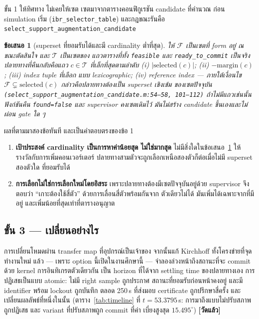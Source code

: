 \documentclass[12pt,a4paper]{article}
\newtheorem{proposition}{ข้อเสนอ}
\theoremstyle{remark}
\newcommand{\code}[1]{\texttt{\small #1}}
\newcommand{\measured}{\textcolor{ok}{\textbf{[วัดแล้ว]}}}
\begin{document}
ขั้น 1 ให้ทิศทาง ไม่เคยให้เซต เซตมาจากตารางคอนฟิกูเรชัน candidate ที่คำนวณ
ก่อน simulation เริ่ม (\code{ibr\_selector\_table}) และกฎขณะรันคือ
\code{select\_support\_augmentation\_candidate}

\begin{proposition}[superset ที่ยอมรับได้และมี cardinality ต่ำที่สุด]
\label{prop:superset}
ให้ $\mathcal{F}$ เป็นเซตที่ form อยู่ ณ ขณะตัดสินใจ และ $\mathcal{T}$ เป็นเซตของ
แถวตารางที่ทั้ง \code{feasible} และ \code{ready\_to\_commit} เป็นจริง
ปลายทางที่คืนกลับคือแถว $c \in \mathcal{T}$ ที่เล็กที่สุดตามลำดับ (i)
$|\mathrm{selected}(c)|$; (ii) $-\mathrm{margin}(c)$; (iii) index tuple ที่เลือก
แบบ lexicographic; (iv) reference index --- ภายใต้เงื่อนไข
$\mathcal{F} \subsetneq \mathrm{selected}(c)$ กล่าวคือปลายทางต้องเป็น superset
\emph{เชิงเข้ม} ของเซตปัจจุบัน
\code{(select\_support\_augmentation\_candidate.m:54--58, 101--112)}
ถ้าไม่มีแถวเช่นนั้น ฟังก์ชันคืน \code{found=false} และ supervisor คงเซตเดิมไว้
มันไม่สร้าง candidate ขึ้นเองและไม่ผ่อน gate ใด ๆ
\end{proposition}

ผลที่ตามมาสองข้อทันที และเป็นคำตอบตรงของข้อ 1

\begin{enumerate}[leftmargin=1.9em]
\item \textbf{เป้าประสงค์ cardinality เป็นการหาค่าน้อยสุด ไม่ใช่มากสุด}
      ไม่มีสิ่งใดในข้อเสนอ~\ref{prop:superset} ให้รางวัลกับการเพิ่มคอนเวอร์เตอร์
      ปลายทางสามตัวจะถูกเลือกเหนือสองตัวก็ต่อเมื่อไม่มี superset สองตัวใด
      ที่ยอมรับได้
\item \textbf{การเลือกไม่ใช่การเลือกใหม่โดยอิสระ} เพราะปลายทางต้องมีเซตปัจจุบันอยู่ด้วย
      supervisor จึงตอบว่า ``เกาะต้องใช้สี่ตัว'' ด้วยการเลื่อนสี่ตัวพร้อมกันจาก
      ตัวเดียวไม่ได้ มันเพิ่มได้เฉพาะจากที่มีอยู่ และเพิ่มน้อยที่สุดเท่าที่ตารางอนุญาต
\end{enumerate}

\subsection{ขั้น 3 --- เปลี่ยนอย่างไร}

การเปลี่ยนโหมดผ่าน transfer map ที่อุปกรณ์เป็นเจ้าของ จากนั้นแก้ Kirchhoff
ทั้งโครงข่ายที่จุดทำงานใหม่ แล้ว --- เพราะ option นี้เปิดในงานศึกษานี้ ---
จำลองล่วงหน้าถึงสถานะที่จะ commit ด้วย kernel การอินทิเกรตตัวเดียวกัน
เป็น horizon ที่ได้จาก settling time ของปลายทางเอง การปฏิเสธเป็นแบบ atomic:
ไม่มี right sample ถูกประกาศ สถานะที่ยอมรับก่อนหน้าคงอยู่ และมี identifier
พร้อม lockout ถูกบันทึก ตลอด 250\,s ที่ส่งมอบ certificate ถูกปรึกษาสี่ครั้ง
และเปลี่ยนผลลัพธ์ที่หนึ่งในนั้น (ตาราง~\ref{tab:timeline} ที่ $t = 53.3795$\,s:
การมาถึงแบบไม่ปรับสภาพถูกปฏิเสธ และ variant ที่ปรับสภาพถูก commit ที่ค่า
เบี่ยงสูงสุด $15.495^{\circ}$) \measured
\end{document}
